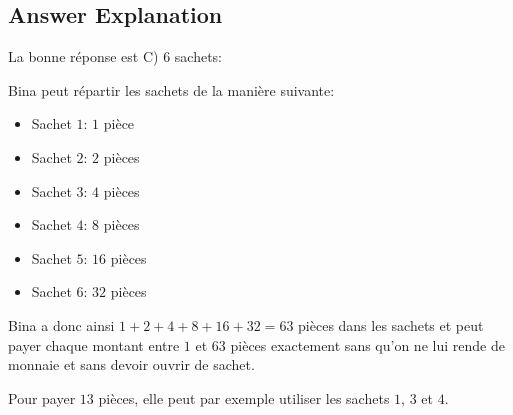 \documentclass[a4paper,11pt]{report}
\newcommand{\taskGraphicsFolder}{..}
\begin{document}
\endgroup

\subsection*{Answer Explanation}

La bonne réponse est C) $6$ sachets:

{\centering%
\par}

Bina peut répartir les sachets de la manière suivante:

\begin{itemize}
  \item Sachet $1$: $1$ pièce
  \item Sachet $2$: $2$ pièces
  \item Sachet $3$: $4$ pièces
  \item Sachet $4$: $8$ pièces
  \item Sachet $5$: $16$ pièces
  \item Sachet $6$: $32$ pièces
\end{itemize}

Bina a donc ainsi ${1 + 2 + 4 + 8 + 16 + 32 = 63}$ pièces dans les sachets et peut payer chaque montant entre $1$ et $63$ pièces exactement sans qu’on ne lui rende de monnaie et sans devoir ouvrir de sachet.

Pour payer $13$ pièces, elle peut par exemple utiliser les sachets $1$, $3$ et $4$.
\end{document}
